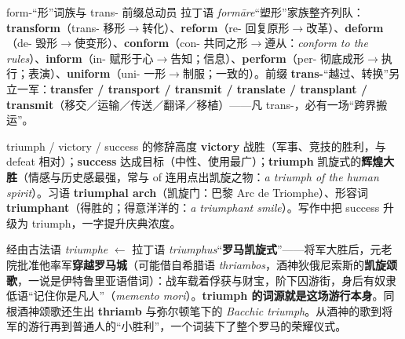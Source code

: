 \documentclass[../main.tex]{subfiles}
\begin{document}


\begin{gram}{form-“形”词族与 trans- 前缀总动员}
拉丁语 \textit{formāre}“塑形”家族整齐列队：\textbf{transform}（trans- 移形$\to$转化）、\textbf{reform}（re- 回复原形$\to$改革）、\textbf{deform}（de- 毁形$\to$使变形）、\textbf{conform}（con- 共同之形$\to$遵从：\textit{conform to the rules}）、\textbf{inform}（in- 赋形于心$\to$告知；信息）、\textbf{perform}（per- 彻底成形$\to$执行；表演）、\textbf{uniform}（uni- 一形$\to$制服；一致的）。前缀 \textbf{trans-}“越过、转换”另立一军：\textbf{transfer / transport / transmit / translate / transplant / transmit}（移交／运输／传送／翻译／移植）——凡 trans-，必有一场“跨界搬运”。
\end{gram}




\begin{gram}{triumph / victory / success 的修辞高度}
\textbf{victory} 战胜（军事、竞技的胜利，与 defeat 相对）；\textbf{success} 达成目标（中性、使用最广）；\textbf{triumph} 凯旋式的\textbf{辉煌大胜}（情感与历史感最强，常与 of 连用点出凯旋之物：\textit{a triumph of the human spirit}）。习语 \textbf{triumphal arch}（凯旋门：巴黎 Arc de Triomphe）、形容词 \textbf{triumphant}（得胜的；得意洋洋的：\textit{a triumphant smile}）。写作中把 success 升级为 triumph，一字提升庆典浓度。
\end{gram}

\begin{origin}
经由古法语 \textit{triumphe} $\leftarrow$ 拉丁语 \textit{triumphus}“\textbf{罗马凯旋式}”——将军大胜后，元老院批准他率军\textbf{穿越罗马城}（可能借自希腊语 \textit{thriambos}，酒神狄俄尼索斯的\textbf{凯旋颂歌}，一说是伊特鲁里亚语借词）：战车载着俘获与财宝，阶下囚游街，身后有奴隶低语“记住你是凡人”（\textit{memento mori}）。\textbf{triumph 的词源就是这场游行本身}。同根酒神颂歌还生出 \textbf{thriamb} 与弥尔顿笔下的 \textit{Bacchic triumph}。从酒神的歌到将军的游行再到普通人的“小胜利”，一个词装下了整个罗马的荣耀仪式。
\end{origin}
\end{document}

